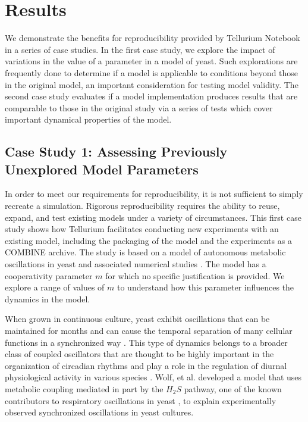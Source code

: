 \documentclass[10pt,letterpaper]{article}
\begin{document}

\section*{Results}

We demonstrate the benefits for reproducibility provided by Tellurium Notebook in a series of case studies. In the first case study, we explore the impact of variations in the value of a parameter in a model of yeast. Such explorations are frequently done to determine if a model is applicable to conditions beyond those in the original model, an important consideration for testing model validity. The second case study evaluates if a model implementation produces results that are comparable to those in the original study via a series of tests which cover important dynamical properties of the model.

\subsection*{Case Study 1: Assessing Previously Unexplored Model Parameters}

In order to meet our requirements for reproducibility, it is not sufficient to simply recreate a simulation. Rigorous reproducibility requires the ability to reuse, expand, and test existing models under a variety of circumstances. This first case study shows how Tellurium facilitates conducting new experiments with an existing model, including the packaging of the model and the experiments as a COMBINE archive. The study is based on a model of autonomous metabolic oscillations in yeast and associated numerical studies \cite{wolf2001mathematical}. The model has a cooperativity parameter $m$ for which no specific justification is provided. We explore a range of values of $m$ to understand how this parameter influences the dynamics in the model.

When grown in continuous culture, yeast exhibit oscillations that can be maintained for months and can cause the temporal separation of many cellular functions in a synchronized way \cite{murray2007regulation}. This type of dynamics belongs to a broader class of coupled oscillators that are thought to be highly important in the organization of circadian rhythms and play a role in the regulation of diurnal physiological activity in various species \cite{winfree1967biological,dodd2005plant}.
Wolf, et al. \cite{wolf2001mathematical} developed a model that uses metabolic coupling mediated in part by the $H_2 S$ pathway, one of the known contributors to respiratory oscillations in yeast \cite{murray2007regulation}, to explain experimentally observed synchronized oscillations in yeast cultures.
\end{document}
